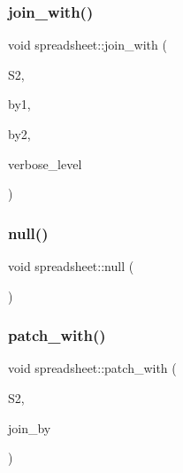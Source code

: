 \subsubsection{\texorpdfstring{join\+\_\+with()}{join\_with()}}
{\footnotesize\ttfamily void spreadsheet\+::join\+\_\+with (\begin{DoxyParamCaption}\item[{\mbox{\hyperlink{classspreadsheet}{spreadsheet}} $\ast$}]{S2,  }\item[{\mbox{\hyperlink{galois_8h_a09fddde158a3a20bd2dcadb609de11dc}{I\+NT}}}]{by1,  }\item[{\mbox{\hyperlink{galois_8h_a09fddde158a3a20bd2dcadb609de11dc}{I\+NT}}}]{by2,  }\item[{\mbox{\hyperlink{galois_8h_a09fddde158a3a20bd2dcadb609de11dc}{I\+NT}}}]{verbose\+\_\+level }\end{DoxyParamCaption})}

\mbox{\label{classspreadsheet_a69de03c34f8556d93388fe8c6233189c}} 
\subsubsection{\texorpdfstring{null()}{null()}}
{\footnotesize\ttfamily void spreadsheet\+::null (\begin{DoxyParamCaption}{ }\end{DoxyParamCaption})}

\mbox{\label{classspreadsheet_a6da34f3003f060fbe97e8661b7ead5bc}} 
\subsubsection{\texorpdfstring{patch\+\_\+with()}{patch\_with()}}
{\footnotesize\ttfamily void spreadsheet\+::patch\+\_\+with (\begin{DoxyParamCaption}\item[{\mbox{\hyperlink{classspreadsheet}{spreadsheet}} $\ast$}]{S2,  }\item[{\mbox{\hyperlink{galois_8h_ab6cc7b4aeb6ea31aba2b3fbfc83ff5e6}{B\+Y\+TE}} $\ast$}]{join\+\_\+by }\end{DoxyParamCaption})}

\mbox{\label{classspreadsheet_a0760eae2a96ee698fef84cd8f2655197}} 
